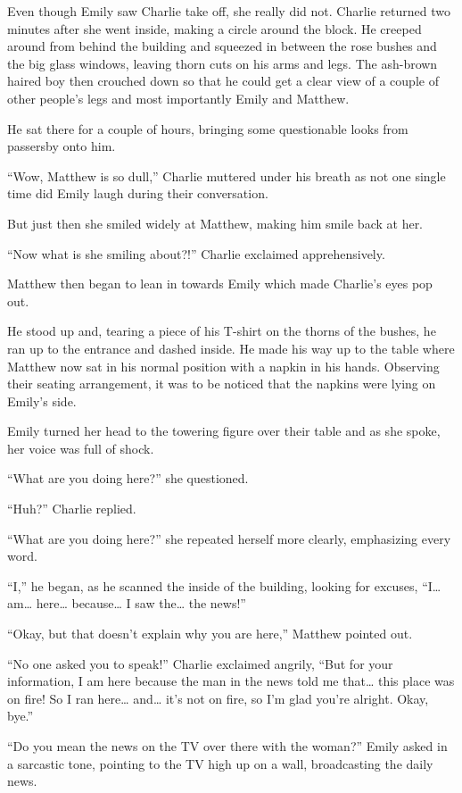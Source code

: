 Even though Emily saw Charlie take off, she really did not. Charlie returned two minutes after she went inside, making a circle around the block. He creeped around from behind the building and squeezed in between the rose bushes and the big glass windows, leaving thorn cuts on his arms and legs. The ash-brown haired boy then crouched down so that he could get a clear view of a couple of other people’s legs and most importantly Emily and Matthew.

He sat there for a couple of hours, bringing some questionable looks from passersby onto him.

“Wow, Matthew is so dull,” Charlie muttered under his breath as not one single time did Emily laugh during their conversation.

But just then she smiled widely at Matthew, making him smile back at her.

“Now what is she smiling about?!” Charlie exclaimed apprehensively.

Matthew then began to lean in towards Emily which made Charlie’s eyes pop out.

He stood up and, tearing a piece of his T-shirt on the thorns of the bushes, he ran up to the entrance and dashed inside. He made his way up to the table where Matthew now sat in his normal position with a napkin in his hands. Observing their seating arrangement, it was to be noticed that the napkins were lying on Emily’s side.

Emily turned her head to the towering figure over their table and as she spoke, her voice was full of shock.

“What are you doing here?” she questioned.

“Huh?” Charlie replied.

“What are you doing here?” she repeated herself more clearly, emphasizing every word.

“I,” he began, as he scanned the inside of the building, looking for excuses, “I… am… here… because… I saw the… the news!”

“Okay, but that doesn’t explain why you are here,” Matthew pointed out.

“No one asked you to speak!” Charlie exclaimed angrily, “But for your information, I am here because the man in the news told me that… this place was on fire! So I ran here… and… it’s not on fire, so I’m glad you’re alright. Okay, bye.”

“Do you mean the news on the TV over there with the woman?” Emily asked in a sarcastic tone, pointing to the TV high up on a wall, broadcasting the daily news.

